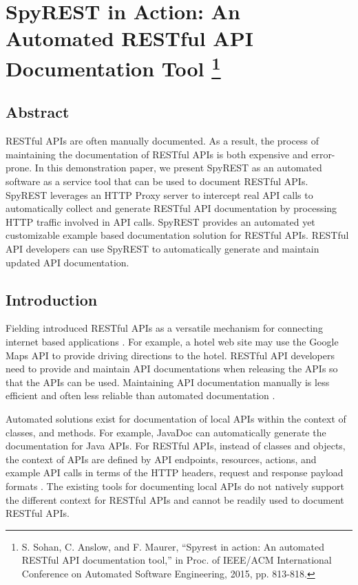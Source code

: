 \chapter{\texorpdfstring{SpyREST in Action: An Automated RESTful API Documentation Tool \protect\footnote{S. Sohan, C. Anslow, and F. Maurer, ``Spyrest in action: An automated RESTful API documentation tool,'' in Proc. of IEEE/ACM International Conference on Automated Software Engineering, 2015, pp. 813-818.}}{SpyREST in Action: An Automated RESTful API Documentation Tool}}
\label{chapter:demo_paper}

\section{Abstract}
RESTful APIs are often manually documented. As a result, the process of maintaining the documentation of RESTful APIs is both expensive and error-prone. In this demonstration paper, we present SpyREST as an automated software as a service tool that can be used to document RESTful APIs. SpyREST leverages an HTTP Proxy server to intercept real API calls to automatically collect and generate RESTful API documentation by processing HTTP traffic involved in API calls. SpyREST provides an automated yet customizable example based documentation solution for RESTful APIs. RESTful API developers can use SpyREST to automatically generate and maintain updated API documentation.


\section{Introduction}
Fielding introduced RESTful APIs as a versatile mechanism for connecting internet based applications \cite{Fielding_rest}. For example, a hotel web site may use the Google Maps API to provide driving directions to the hotel. RESTful API developers need to provide and maintain API documentations when releasing the APIs so that the APIs can be used. Maintaining API documentation manually is less efficient and often less reliable than automated documentation \cite{Espinha_web}.

Automated solutions exist for documentation of local APIs within the context of classes, and methods. For example, JavaDoc can automatically generate the documentation for Java APIs. For RESTful APIs, instead of classes and objects, the context of APIs are defined by API endpoints, resources, actions, and example API calls in terms of the HTTP headers, request and response payload formats \cite{Danielsen_validation}. The existing tools for documenting local APIs do not natively support the different context for RESTful APIs and cannot be readily used to document RESTful APIs.

